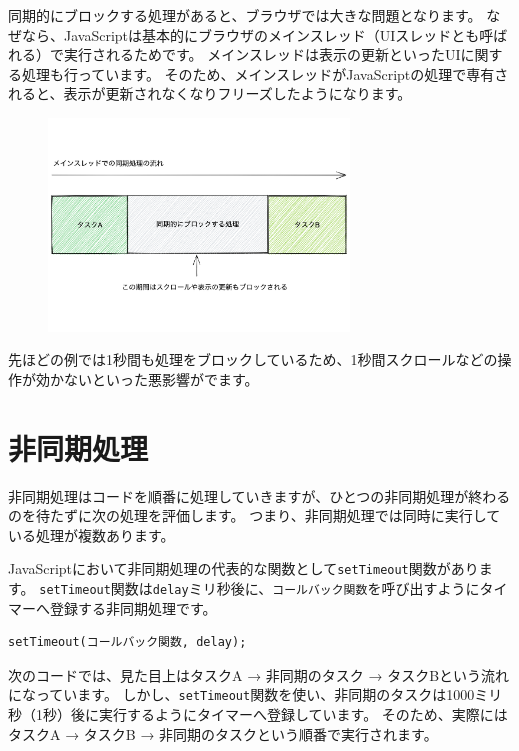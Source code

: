 同期的にブロックする処理があると、ブラウザでは大きな問題となります。
なぜなら、JavaScriptは基本的にブラウザのメインスレッド（UIスレッドとも呼ばれる）で実行されるためです。
メインスレッドは表示の更新といったUIに関する処理も行っています。
そのため、メインスレッドがJavaScriptの処理で専有されると、表示が更新されなくなりフリーズしたようになります。

\begin{figure}[h]
\centering
\includegraphics[width=80mm]{fig/single-thread-tasks.pdf}
\end{figure}

先ほどの例では1秒間も処理をブロックしているため、1秒間スクロールなどの操作が効かないといった悪影響がでます。

\hypertarget{async-processing}{%
\section{非同期処理}\label{async-processing}}

非同期処理はコードを順番に処理していきますが、ひとつの非同期処理が終わるのを待たずに次の処理を評価します。
つまり、非同期処理では同時に実行している処理が複数あります。

JavaScriptにおいて非同期処理の代表的な関数として\texttt{setTimeout}関数があります。
\texttt{setTimeout}関数は\texttt{delay}ミリ秒後に、\texttt{コールバック関数}を呼び出すようにタイマーへ登録する非同期処理です。

\begin{lstlisting}
setTimeout(コールバック関数, delay);
\end{lstlisting}

次のコードでは、見た目上はタスクA → 非同期のタスク → タスクBという流れになっています。
しかし、\texttt{setTimeout}関数を使い、非同期のタスクは1000ミリ秒（1秒）後に実行するようにタイマーへ登録しています。
そのため、実際にはタスクA → タスクB → 非同期のタスクという順番で実行されます。

